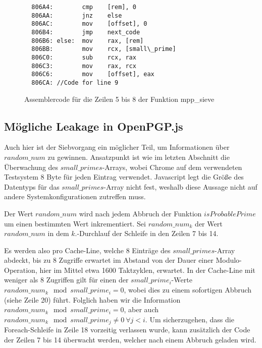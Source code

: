 \begin{figure}[h]
\label{fig:assemblyMppSieve}
\renewcommand\fcolorbox[4][]{\textcolor{black}{\strut#4}}
\small
\begin{verbatim}
  806A4:        cmp    [rem], 0
  806AA:        jnz    else
  806AC:        mov    [offset], 0  
  806B4:        jmp    next_code
  806B6: else:  mov    rax, [rem]
  806BB:        mov    rcx, [small\_prime]
  806C0:        sub    rcx, rax
  806C3:        mov    rax, rcx
  806C6:        mov    [offset], eax
  806CA: //Code for line 9
\end{verbatim}
\normalsize
\caption{Assemblercode für die Zeilen 5 bis 8 der Funktion mpp_sieve}
\end{figure}

\subsection{Mögliche Leakage in OpenPGP.js}

Auch hier ist der Siebvorgang ein möglicher Teil, um Informationen über $random\_num$ zu gewinnen.
Ansatzpunkt ist wie im letzten Abschnitt die Überwachung des $small\_primes$-Arrays, wobei Chrome auf dem verwendeten Testsystem 8 Byte für jeden Eintrag verwendet. Javascript legt die Größe des Datentyps für das $small\_primes$-Array nicht fest, weshalb diese Aussage nicht auf andere Systemkonfigurationen zutreffen muss.

Der Wert $random\_num$ wird nach jedem Abbruch der Funktion $isProbablePrime$ um einen bestimmten Wert inkrementiert.
Sei $random\_num_k$ der Wert $random\_num$ in dem $k.$-Durchlauf der Schleife in den Zeilen 7 bis 14.

Es werden also pro Cache-Line, welche 8 Einträge des $small\_primes$-Array abdeckt, bis zu 8 Zugriffe erwartet im Abstand von der Dauer einer Modulo-Operation, hier im Mittel etwa 1600 Taktzyklen, erwartet. 
In der Cache-Line mit weniger als 8 Zugriffen gilt für einen der $small\_prime_i$-Werte $random\_num_k \mod small\_prime_i = 0$, wobei dies zu einem sofortigen Abbruch (siehe Zeile 20) führt.
Folglich haben wir die Information $random\_num_k \mod small\_prime_i = 0$, aber auch $random\_num_k \mod small\_prime_j \neq 0 \: \forall j < i$.
Um sicherzugehen, dass die Foreach-Schleife in Zeile 18 vorzeitig verlassen wurde, kann zusätzlich der Code der Zeilen 7 bis 14 überwacht werden, welcher nach einem Abbruch geladen wird.

